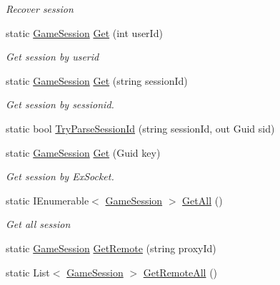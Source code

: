 \begin{DoxyCompactItemize}
\begin{DoxyCompactList}\small\item\em Recover session \end{DoxyCompactList}\item 
static \mbox{\hyperlink{class_t_net_1_1_contract_1_1_game_session}{Game\+Session}} \mbox{\hyperlink{class_t_net_1_1_contract_1_1_game_session_ad564fa7fcacfe5b3dfb72936e9a14c68}{Get}} (int user\+Id)
\begin{DoxyCompactList}\small\item\em Get session by userid \end{DoxyCompactList}\item 
static \mbox{\hyperlink{class_t_net_1_1_contract_1_1_game_session}{Game\+Session}} \mbox{\hyperlink{class_t_net_1_1_contract_1_1_game_session_a4d88c16d0dfac967a8cfc3ff4821dc86}{Get}} (string session\+Id)
\begin{DoxyCompactList}\small\item\em Get session by sessionid. \end{DoxyCompactList}\item 
static bool \mbox{\hyperlink{class_t_net_1_1_contract_1_1_game_session_a74777e0bec09dbd6d58814300a768103}{Try\+Parse\+Session\+Id}} (string session\+Id, out Guid sid)
\item 
static \mbox{\hyperlink{class_t_net_1_1_contract_1_1_game_session}{Game\+Session}} \mbox{\hyperlink{class_t_net_1_1_contract_1_1_game_session_afd9b824a348ce50e5c8dbdeffdb32cba}{Get}} (Guid key)
\begin{DoxyCompactList}\small\item\em Get session by Ex\+Socket. \end{DoxyCompactList}\item 
static I\+Enumerable$<$ \mbox{\hyperlink{class_t_net_1_1_contract_1_1_game_session}{Game\+Session}} $>$ \mbox{\hyperlink{class_t_net_1_1_contract_1_1_game_session_a2b1701baee2a3c8d412568e6173a56fd}{Get\+All}} ()
\begin{DoxyCompactList}\small\item\em Get all session \end{DoxyCompactList}\item 
static \mbox{\hyperlink{class_t_net_1_1_contract_1_1_game_session}{Game\+Session}} \mbox{\hyperlink{class_t_net_1_1_contract_1_1_game_session_ab8b4c73cc5f7eac0d342961fc786566f}{Get\+Remote}} (string proxy\+Id)
\item 
static List$<$ \mbox{\hyperlink{class_t_net_1_1_contract_1_1_game_session}{Game\+Session}} $>$ \mbox{\hyperlink{class_t_net_1_1_contract_1_1_game_session_a5f5c60f6e01d8a088c49052bc3e15d4c}{Get\+Remote\+All}} ()

\end{DoxyCompactItemize}
